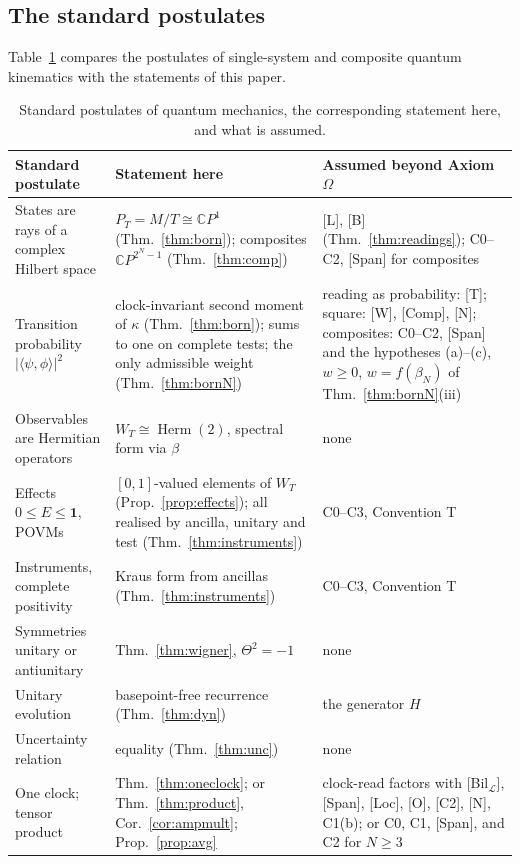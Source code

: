 \documentclass[aps,pra,onecolumn,superscriptaddress,nofootinbib,10pt]{revtex4-2}
\theoremstyle{definition}
\theoremstyle{remark}
\newcommand{\C}{\mathbb{C}}
\newcommand{\cL}{\mathcal{L}}
\newcommand{\Herm}{\operatorname{Herm}}
\newcommand{\ip}[2]{\langle #1,#2\rangle}
\begin{document}
\subsection{The standard postulates}
Table~\ref{tab:postulates} compares the postulates of single-system and composite quantum kinematics
with the statements of this paper.

\begin{table}[h]
\caption{Standard postulates of quantum mechanics, the corresponding statement here, and what is assumed.}
\label{tab:postulates}
\footnotesize
\begin{tabular}{@{}p{}p{}p{}@{}}
\toprule
Standard postulate & Statement here & Assumed beyond Axiom $\Omega$\\
\midrule
States are rays of a complex Hilbert space & $P_T=M/T\cong\C P^1$ (Thm.~\ref{thm:born}); composites $\C P^{2^N-1}$ (Thm.~\ref{thm:comp}) & [L], [B] (Thm.~\ref{thm:readings}); C0--C2, [Span] for composites\\
Transition probability $\lvert\ip{\psi}{\phi}\rvert^2$ & clock-invariant second moment of $\kappa$ (Thm.~\ref{thm:born}); sums to one on complete tests; the only admissible weight (Thm.~\ref{thm:bornN}) & reading as probability: [T]; square: [W], [Comp], [N]; composites: C0--C2, [Span] and the hypotheses (a)--(c), $w\ge0$, $w=f(\beta_N)$ of Thm.~\ref{thm:bornN}(iii)\\
Observables are Hermitian operators & $W_T\cong\Herm(2)$, spectral form via $\beta$ & none\\
Effects $0\le E\le\mathbf1$, POVMs & $[0,1]$-valued elements of $W_T$ (Prop.~\ref{prop:effects}); all realised by ancilla, unitary and test (Thm.~\ref{thm:instruments}) & C0--C3, Convention T\\
Instruments, complete positivity & Kraus form from ancillas (Thm.~\ref{thm:instruments}) & C0--C3, Convention T\\
Symmetries unitary or antiunitary & Thm.~\ref{thm:wigner}, $\Theta^2=-1$ & none\\
Unitary evolution & basepoint-free recurrence (Thm.~\ref{thm:dyn}) & the generator $H$\\
Uncertainty relation & equality (Thm.~\ref{thm:unc}) & none\\
One clock; tensor product & Thm.~\ref{thm:oneclock}; or Thm.~\ref{thm:product}, Cor.~\ref{cor:ampmult}; Prop.~\ref{prop:avg} & clock-read factors with [Bil$_\cL$], [Span], [Loc], [O], [C2], [N], C1(b); or C0, C1, [Span], and C2 for $N\ge3$\\

\end{tabular}
\end{table}
\end{document}
